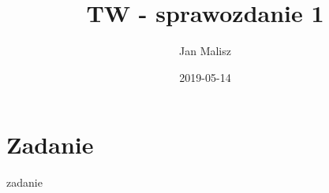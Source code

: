 \documentclass[10pt,a4paper]{article}
\title{TW - sprawozdanie 1}
\author{Jan Malisz}
\date{2019-05-14}
\begin{document}
  \maketitle
  \thispagestyle{empty}
  \newpage

  \section*{Zadanie}\label{sec:Zadanie}
  {zadanie}
\end{document}
